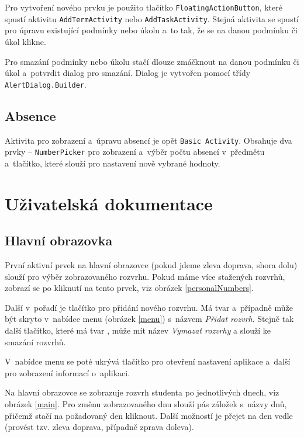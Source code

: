 \documentclass[12pt, a4paper]{article}
\begin{document}
		Pro vytvoření nového prvku je použito tlačítko \texttt{FloatingActionButton}, které spustí aktivitu \texttt{AddTermActivity} nebo \texttt{AddTaskActivity}. Stejná aktivita se spustí pro úpravu existující podmínky nebo úkolu a~to tak, že se na danou podmínku či úkol klikne.
		
		Pro smazání podmínky nebo úkolu stačí dlouze zmáčknout na danou podmínku či úkol a~potvrdit dialog pro smazání. Dialog je vytvořen pomocí třídy \texttt{AlertDialog.Builder}.
		
		\subsection{Absence}
		Aktivita pro zobrazení a~úpravu absencí je opět \texttt{Basic Activity}. Obsahuje dva prvky -- \texttt{NumberPicker} pro zobrazení a~výběr počtu absencí v~předmětu a~tlačítko, které slouží pro nastavení nově vybrané hodnoty.
	
	\section{Uživatelská dokumentace}
		\subsection{Hlavní obrazovka}
		První aktivní prvek na hlavní obrazovce (pokud jdeme zleva doprava, shora dolu) slouží pro výběr zobrazovaného rozvrhu. Pokud máme více stažených rozvrhů, zobrazí se po kliknutí na tento prvek, viz obrázek \ref{personalNumbers}.
		
		Další v~pořadí je tlačítko pro přidání nového rozvrhu. Má tvar  a~případně může být skryto v~nabídce menu (obrázek \ref{menu}) s~názvem \emph{Přidat rozvrh}. Stejně tak další tlačítko, které má tvar , může mít název \emph{Vymazat rozvrhy} a slouží ke smazání rozvrhů.
		
		V~nabídce menu se poté ukrývá tlačítko pro otevření nastavení aplikace a~další pro zobrazení informací o~aplikaci.
		
		Na hlavní obrazovce se zobrazuje rozvrh studenta po jednotlivých dnech, viz obrázek \ref{main}. Pro změnu zobrazovaného dnu slouží pás záložek s~názvy dnů, přičemž stačí na požadovaný den kliknout. Další možností je přejet na den vedle (provést tzv.  zleva doprava, případně zprava doleva).
		
\end{document}
